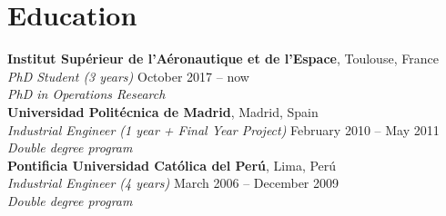 \section{Education}

    \textbf{Institut Supérieur de l'Aéronautique et de l'Espace}, Toulouse, France \vspace{0mm}\\%
        \textsl{PhD Student (3 years)}
            \hfill October 2017 -- now \\\vspace{0mm}
        \textsl{PhD in Operations Research} \vspace{2mm}
        \vspace{2mm}\\\vspace{0mm}%
    \textbf{Universidad Politécnica de Madrid}, Madrid, Spain \vspace{0mm}\\%
    	\textsl{Industrial Engineer (1 year + Final Year Project)}
    		\hfill February 2010 -- May 2011 \\\vspace{0mm}
    	\textsl{Double degree program} \vspace{2mm}
		\vspace{2mm}\\\vspace{0mm}%
    \textbf{Pontificia Universidad Católica del Perú}, Lima, Perú \vspace{0mm}\\%
    	\textsl{Industrial Engineer (4 years)}
    		\hfill March 2006 -- December 2009 \\\vspace{0mm}
    	\textsl{Double degree program} \vspace{2mm}
